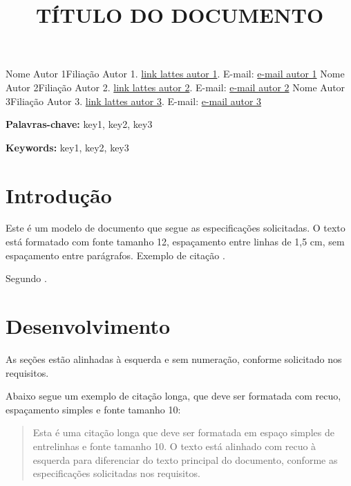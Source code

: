 \documentclass{wticifes}
\begin{document}
\onehalfspacing

\title{TÍTULO DO DOCUMENTO}
\maketitle
{Nome Autor 1}{Filiação Autor 1. \url{link lattes autor 1}. E-mail: \url{e-mail autor 1}}
{Nome Autor 2}{Filiação Autor 2. \url{link lattes autor 2}. E-mail: \url{e-mail autor 2}}
{Nome Autor 3}{Filiação Autor 3. \url{link lattes autor 3}. E-mail: \url{e-mail autor 3}}


\begin{resumo}
\lipsum[1]
\end{resumo}

\noindent\textbf{Palavras-chave:} key1, key2, key3

\vspace{0.5cm}
\begin{abstract}
\lipsum[1]
\end{abstract}

\noindent\textbf{Keywords:} key1, key2, key3

\section{Introdução}
Este é um modelo de documento que segue as especificações solicitadas. O texto está formatado com fonte tamanho 12, espaçamento entre linhas de 1,5 cm, sem espaçamento entre parágrafos. Exemplo de citação \cite{teste2023}.

Segundo .

\lipsum[1]

\section{Desenvolvimento}
As seções estão alinhadas à esquerda e sem numeração, conforme solicitado
nos requisitos.

\lipsum[1]

Abaixo segue um exemplo de citação longa, que deve ser formatada com recuo, espaçamento simples e fonte tamanho 10:

\begin{quote}
Esta é uma citação longa que deve ser formatada em espaço simples de entrelinhas e fonte tamanho 10. O texto está alinhado com recuo à esquerda para diferenciar do texto principal do documento, conforme as especificações solicitadas nos requisitos.
\end{quote}
\end{document}
